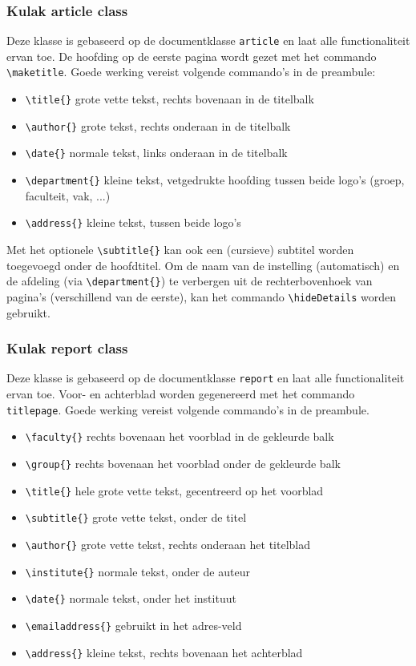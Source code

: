 \documentclass[kulak]{kulakarticle} %
\begin{document}
\subsubsection{Kulak article class}

Deze klasse is gebaseerd op de documentklasse \texttt{article} en laat alle functionaliteit ervan toe. De hoofding op de eerste pagina wordt gezet met het commando \verb+\maketitle+.
Goede werking vereist volgende commando's in de preambule:
\begin{itemize}
	\item \verb+\title{}+ grote vette tekst, rechts bovenaan in de titelbalk
	\item \verb+\author{}+ grote tekst, rechts onderaan in de titelbalk
	\item \verb+\date{}+ normale tekst, links onderaan in de titelbalk
	\item \verb+\department{}+ kleine tekst, vetgedrukte hoofding tussen beide logo's (groep, faculteit, vak, ...)
	\item \verb+\address{}+ kleine tekst, tussen beide logo's
\end{itemize}
Met het optionele \verb+\subtitle{}+ kan ook een (cursieve) subtitel worden toegevoegd onder de hoofdtitel.
Om de naam van de instelling (automatisch) en de afdeling (via \verb+\department{}+) te verbergen uit de rechterbovenhoek van pagina's (verschillend van de eerste), kan het commando \verb+\hideDetails+ worden gebruikt.

\subsubsection{Kulak report class}

Deze klasse is gebaseerd op de documentklasse \texttt{report} en laat alle functionaliteit ervan toe. Voor- en achterblad worden gegenereerd met het commando \verb+titlepage+. Goede werking vereist volgende commando's in de preambule.

\begin{itemize}
	\item \verb+\faculty{}+ rechts bovenaan het voorblad in de gekleurde balk
	\item \verb+\group{}+ rechts bovenaan het voorblad onder de gekleurde balk
	\item \verb+\title{}+ hele grote vette tekst, gecentreerd op het voorblad
	\item \verb+\subtitle{}+ grote vette tekst, onder de titel
	\item \verb+\author{}+ grote vette tekst, rechts onderaan het titelblad
	\item \verb+\institute{}+ normale tekst, onder de auteur
	\item \verb+\date{}+ normale tekst, onder het instituut
	\item \verb+\emailaddress{}+ gebruikt in het adres-veld
	\item \verb+\address{}+ kleine tekst, rechts bovenaan het achterblad
\end{itemize}
\end{document}
